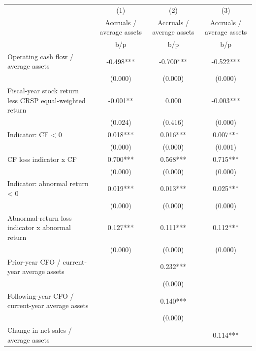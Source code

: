 {
\def\sym#1{\ifmmode^{#1}\else\(^{#1}\)\fi}
\begin{tabular}{l*{3}{c}}
\hline\hline
                    &\multicolumn{1}{c}{(1)}&\multicolumn{1}{c}{(2)}&\multicolumn{1}{c}{(3)}\\
                    &\multicolumn{1}{c}{Accruals / average assets}&\multicolumn{1}{c}{Accruals / average assets}&\multicolumn{1}{c}{Accruals / average assets}\\
                    &         b/p   &         b/p   &         b/p   \\
\hline
Operating cash flow / average assets&      -0.498***&      -0.700***&      -0.522***\\
                    &     (0.000)   &     (0.000)   &     (0.000)   \\
Fiscal-year stock return less CRSP equal-weighted return&      -0.001** &       0.000   &      -0.003***\\
                    &     (0.024)   &     (0.416)   &     (0.000)   \\
Indicator: CF < 0   &       0.018***&       0.016***&       0.007***\\
                    &     (0.000)   &     (0.000)   &     (0.001)   \\
CF loss indicator x CF&       0.700***&       0.568***&       0.715***\\
                    &     (0.000)   &     (0.000)   &     (0.000)   \\
Indicator: abnormal return < 0&       0.019***&       0.013***&       0.025***\\
                    &     (0.000)   &     (0.000)   &     (0.000)   \\
Abnormal-return loss indicator x abnormal return&       0.127***&       0.111***&       0.112***\\
                    &     (0.000)   &     (0.000)   &     (0.000)   \\
Prior-year CFO / current-year average assets&               &       0.232***&               \\
                    &               &     (0.000)   &               \\
Following-year CFO / current-year average assets&               &       0.140***&               \\
                    &               &     (0.000)   &               \\
Change in net sales / average assets&               &               &       0.114***\\

\end{tabular}}
